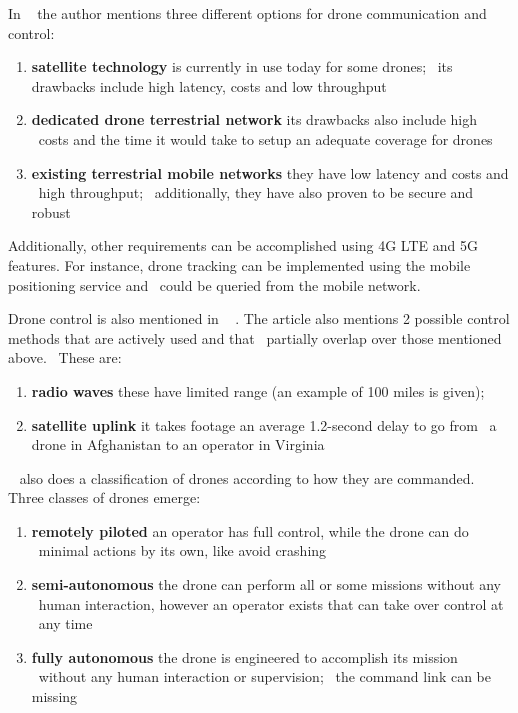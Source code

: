In ~\cite{ericsson1} the author mentions three different options for drone communication and control:
\begin{enumerate}
    \item \textbf{satellite technology} is currently in use today for some drones; \
            its drawbacks include high latency, costs and low throughput
    \item \textbf{dedicated drone terrestrial network} its drawbacks also include high \
            costs and the time it would take to setup an adequate coverage for drones
    \item \textbf{existing terrestrial mobile networks} they have low latency and costs and \
            high throughput; \
            additionally, they have also proven to be secure and robust
\end{enumerate}

Additionally, other requirements can be accomplished using 4G LTE and 5G features.
For instance, drone tracking can be implemented using the mobile positioning service and \
could be queried from the mobile network.

Drone control is also mentioned in ~\cite{forbes1} .
The article also mentions 2 possible control methods that are actively used and that \
partially overlap over those mentioned above. \
These are:
\begin{enumerate}
    \item \textbf{radio waves} these have limited range (an example of 100 miles is given);
    \item \textbf{satellite uplink} it takes footage an average 1.2-second delay to go from \
            a drone in Afghanistan to an operator in Virginia
\end{enumerate}

~\cite{forbes1} also does a classification of drones according to how they are commanded.
Three classes of drones emerge:
\begin{enumerate}
    \item \textbf{remotely piloted} an operator has full control, while the drone can do \
            minimal actions by its own, like avoid crashing
    \item \textbf{semi-autonomous} the drone can perform all or some missions without any \
            human interaction, however an operator exists that can take over control at \
            any time
    \item \textbf{fully autonomous} the drone is engineered to accomplish its mission \
            without any human interaction or supervision; \
            the command link can be missing
\end{enumerate}

